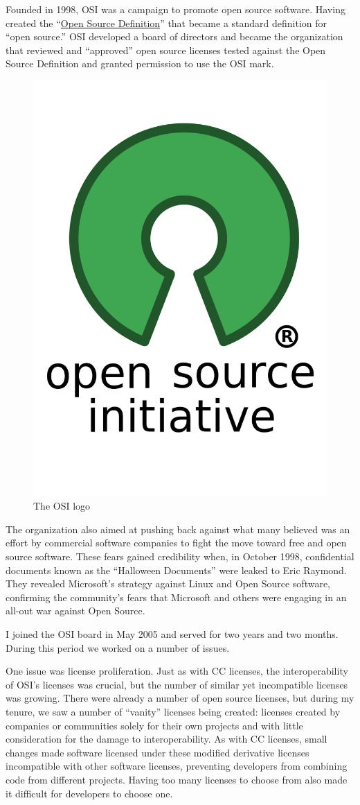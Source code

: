 Founded in 1998, \ac{OSI} was a campaign to promote open source software. Having created the ``\href{https://opensource.org/osd}{Open Source Definition}'' that became a standard definition for ``open source.'' \ac{OSI} developed a board of directors and became the organization that reviewed and ``approved'' open source licenses tested against the Open Source Definition and granted permission to use the \ac{OSI} mark.

\begin{figure}[h]
 \centering
 \includegraphics[width=.5\textwidth]{pictures/Opensource}
 \caption{The \ac{OSI} logo}
 \label{fig:OSI}
\end{figure}


The organization also aimed at pushing back against what many believed was an effort by commercial software companies to fight the move toward free and open source software. These fears gained credibility when, in October 1998, confidential documents known as the ``Halloween Documents'' \cite{Hallowee48:online} were leaked to Eric Raymond. They revealed Microsoft's strategy against Linux and Open Source software, confirming the community's fears that Microsoft and others were engaging in an all-out war against Open Source.

I joined the \ac{OSI} board in May 2005 and served for two years and two months. During this period we worked on a number of issues.

One issue was license proliferation. Just as with \ac{CC} licenses, the interoperability of \ac{OSI}'s licenses was crucial, but the number of similar yet incompatible licenses was growing. There were already a number of open source licenses, but during my tenure, we saw a number of ``vanity'' licenses being created: licenses created by companies or communities solely for their own projects and with little consideration for the damage to interoperability. As with \ac{CC} licenses, small changes made software licensed under these modified derivative licenses incompatible with other software licenses, preventing developers from combining code from different projects. Having too many licenses to choose from also made it difficult for developers to choose one. 

